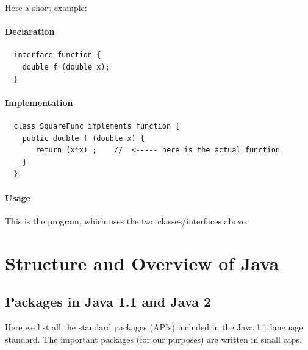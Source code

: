 Here a short example:
\paragraph{Declaration} 
\begin{verbatim}
  interface function {
    double f (double x); 
  }
\end{verbatim}

\paragraph{Implementation}
\begin{verbatim}
  class SquareFunc implements function {
    public double f (double x) {
       return (x*x) ;    //  <----- here is the actual function
    }
  }
\end{verbatim}

\paragraph{Usage} 
This is the program, which uses the two classes/interfaces above.

\section{Structure and Overview of Java}

\subsection{Packages in Java 1.1 and Java 2}

Here we list all the standard packages (APIs) included in the Java 1.1
language standard. The important packages (for our purposes) are
written in small caps.

